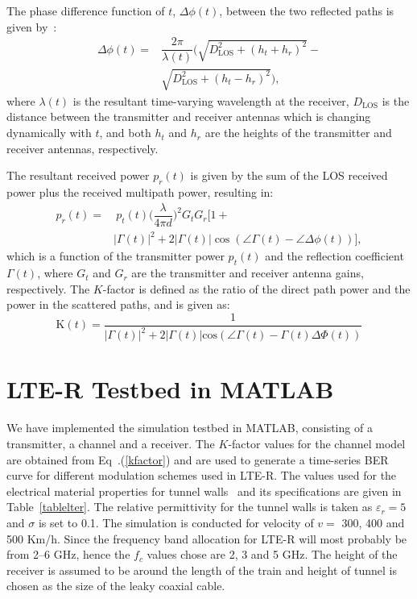 The phase difference function of $t$, $\Delta\phi(t)$, between the two reflected paths is given by~\cite{booklter11}:
\begin{equation}
\begin{split}
\Delta\phi(t) =& \dfrac{2\pi}{\lambda(t)}\bigg(\sqrt{D_{\textrm{LOS}}^2+(h_t+h_r)^2}-\\
& \sqrt{D_{\textrm{LOS}}^2+(h_t-h_r)^2}\bigg),
\end{split}
\end{equation}
where $\lambda(t)$ is the resultant time-varying wavelength at the receiver, $D_{\textrm{LOS}}$ is the distance between the transmitter and receiver antennas which is changing dynamically with $t$, and both $h_t$ and $h_r$ are the heights of the transmitter and receiver antennas, respectively.
 
The resultant received power $p_r(t)$ is given by the sum of the LOS received power plus the received multipath power, resulting in:
\begin{equation}
\begin{split}
p_r(t) =& ~p_t(t)\bigg(\dfrac{\lambda}{4\pi d}\bigg)^2G_t G_r\bigg[1+\\
& |\Gamma(t)|^2+2|\Gamma(t)|\cos(\angle\Gamma(t)-\angle\Delta\phi(t))\bigg],
\end{split}
\end{equation}
which is a function of the transmitter power $p_t(t)$ and the reflection coefficient $\Gamma(t)$, where $G_t$ and $G_r$ are the transmitter and receiver antenna gains,  respectively.
The $K$-factor is defined as the ratio of the direct path power and the power in the scattered paths, and is given as:
\begin{equation}
\label{kfactor}
\mathrm{K}(t) = \dfrac{1}{|\Gamma(t)|^2+2|\Gamma(t)|\textrm{cos}(\angle \Gamma(t)-\Gamma(t)\Delta\Phi(t))}
\end{equation}

\section{LTE-R Testbed in MATLAB}
We have implemented the simulation testbed in MATLAB, consisting of a transmitter, a channel and a receiver. The $K$-factor values for the channel model are obtained from Eq~.(\ref{kfactor}) and are used to generate a time-series BER curve for different modulation schemes used in LTE-R. The values used for the electrical material properties for tunnel walls~\cite{lter17} and its specifications are given in Table~\ref{tablelter}. The relative permittivity for the tunnel walls is taken as $\varepsilon_r = 5$ and $\sigma$ is set to 0.1. The simulation is conducted for velocity of $v = $ 300, 400 and 500 Km/h. Since the frequency band allocation for LTE-R will most probably be from 2--6 GHz, hence the $f_c$ values chose are 2, 3 and 5 GHz. The height of the receiver is assumed to be around the length of the train and height of tunnel is chosen as the size of the leaky coaxial cable.


